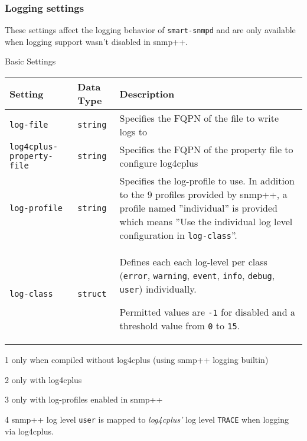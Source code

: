 \begin{minipage}{\textwidth}
\subsubsection{Logging settings}

These settings affect the logging behavior of \texttt{smart-snmpd} and are
only available when logging support wasn't disabled in snmp++.

\begin{threeparttable}
\caption{Basic Settings}
\begin{tabularx}{\textwidth}{@{}*{2}{l}%
 >{\setlength\hsize{0.5\hsize}}X@{}
}
\hline
\textbf{Setting} & \textbf{Data Type} & \textbf{Description}\\
\hline
\texttt{log-file\tnote{1}} & \texttt{string} & Specifies the FQPN of the file to write logs to\\
\texttt{log4cplus-property-file\tnote{2}} & \texttt{string} & Specifies the FQPN of the property file to configure log4cplus \\
\texttt{log-profile\tnote{3}} & \texttt{string} &
Specifies the log-profile to use. In addition to the 9 profiles provided by
snmp++, a profile named ''individual'' is provided which means ''Use the
individual log level configuration in \texttt{log-class}''.\\
\texttt{log-class} & \texttt{struct} & Defines each
each log-level per class (\texttt{error}, \texttt{warning},
\texttt{event}, \texttt{info}, \texttt{debug}, \texttt{user\tnote{4}}) individually.

Permitted values are \texttt{-1} for disabled and a threshold value from
\texttt{0} to \texttt{15}.\\
\hline
\end{tabularx}

\begin{tablenotes}
\item[1] only when compiled without log4cplus (using snmp++ logging builtin)\\
\item[2] only with log4cplus \\
\item[3] only with log-profiles enabled in snmp++\\
\item[4] snmp++ log level \texttt{user} is mapped to \emph{log4cplus'} log level \texttt{TRACE} when logging via log4cplus.
\end{tablenotes}

\end{threeparttable}
\end{minipage}

